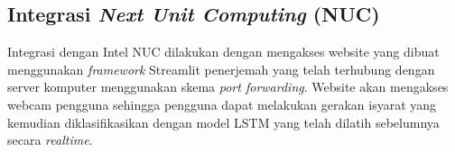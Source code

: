 \subsection{Integrasi \emph{Next Unit Computing} (NUC)}
\label{subsec:integrasiNUC}

Integrasi dengan Intel NUC dilakukan dengan mengakses website yang dibuat menggunakan \emph{framework} Streamlit penerjemah yang telah terhubung dengan server komputer menggunakan skema \emph{port forwarding}. Website akan mengakses webcam pengguna sehingga pengguna dapat melakukan gerakan isyarat yang kemudian diklasifikasikan dengan model LSTM yang telah dilatih sebelumnya secara \emph{realtime}. 











